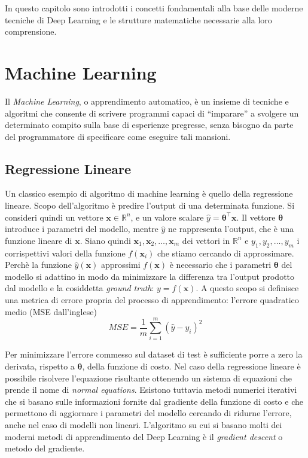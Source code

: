 
In questo capitolo sono introdotti i concetti fondamentali alla base delle
moderne tecniche di Deep Learning e le strutture matematiche necessarie alla
loro comprensione.

\section{Machine Learning}
Il \emph{Machine Learning}, o apprendimento automatico, è un insieme di
tecniche e algoritmi che consente di scrivere programmi capaci di ``imparare''
a svolgere un determinato compito sulla base di esperienze pregresse, senza
bisogno da parte del programmatore di specificare come eseguire tali mansioni. 
\subsection{Regressione Lineare}
Un classico esempio di algoritmo di machine learning è quello della regressione
lineare. Scopo dell'algoritmo è predire l'output di una determinata funzione.
Si consideri quindi un vettore $ \bm x \in \mathbb{R}^n $, e un valore scalare
$\hat{y} = \bm \theta^\intercal \bm x$. Il vettore $\bm \theta$ introduce i
parametri del modello, mentre $\hat{y}$ ne rappresenta l'output, che è una
funzione lineare di $\bm x$. Siano quindi $ \bm x_1, \bm x_2, \dotsc, \bm x_m $
dei vettori in $\mathbb{R}^n$ e  $ y_1, y_2, \dotsc, y_m $ i corrispettivi
valori della funzione $f(\bm x_i)$ che stiamo cercando di approssimare. Perchè
la funzione $\hat{y}(\bm x)$ approssimi $f(\bm x)$ è necessario che i parametri
$\bm \theta$ del modello si adattino in modo da minimizzare la differenza tra
l'output prodotto dal modello e la cosiddetta \emph{ground truth}: $y = f(\bm
x)$. A questo scopo si definisce una metrica di errore propria del processo di
apprendimento: l'errore quadratico medio (MSE dall'inglese) 
\begin{equation} \label{eq:mse}
  MSE = \frac{1}{m} \sum_{i=1}^m{{(\hat{y} - y_i)}^2} 
\end{equation}

Per minimizzare l'errore commesso sul dataset di test è sufficiente porre a
zero la derivata, rispetto a $\bm \theta$, della funzione di costo. Nel caso
della regressione lineare è possibile risolvere l'equazione risultante
ottenendo un sistema di equazioni che prende il nome di \emph{normal
  equations}. Esistono tuttavia metodi numerici iterativi che si basano sulle
informazioni fornite dal gradiente della funzione di costo e che permettono di
aggiornare i parametri del modello cercando di ridurne l'errore, anche nel caso
di modelli non lineari. L'algoritmo su cui si basano molti dei moderni metodi
di apprendimento del Deep Learning è il \emph{gradient descent} o metodo del
gradiente.

